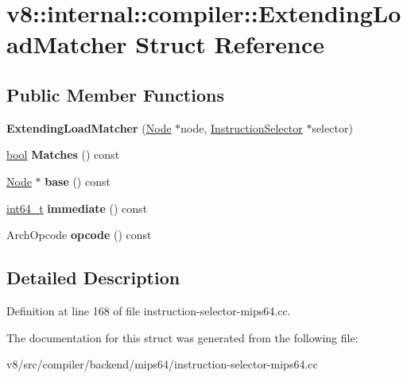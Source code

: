 \hypertarget{structv8_1_1internal_1_1compiler_1_1ExtendingLoadMatcher}{}\section{v8\+:\+:internal\+:\+:compiler\+:\+:Extending\+Load\+Matcher Struct Reference}
\label{structv8_1_1internal_1_1compiler_1_1ExtendingLoadMatcher}
\subsection*{Public Member Functions}
\begin{DoxyCompactItemize}
\item 
\mbox{\label{structv8_1_1internal_1_1compiler_1_1ExtendingLoadMatcher_affb8417c4787548f161146e1b511cd37}} 
{\bfseries Extending\+Load\+Matcher} (\mbox{\hyperlink{classv8_1_1internal_1_1compiler_1_1Node}{Node}} $\ast$node, \mbox{\hyperlink{classv8_1_1internal_1_1compiler_1_1InstructionSelector}{Instruction\+Selector}} $\ast$selector)
\item 
\mbox{\label{structv8_1_1internal_1_1compiler_1_1ExtendingLoadMatcher_a7760a9b638828a662d68f656731f70d3}} 
\mbox{\hyperlink{classbool}{bool}} {\bfseries Matches} () const
\item 
\mbox{\label{structv8_1_1internal_1_1compiler_1_1ExtendingLoadMatcher_a5c77b9446d15b0394c0a931ed8d72e49}} 
\mbox{\hyperlink{classv8_1_1internal_1_1compiler_1_1Node}{Node}} $\ast$ {\bfseries base} () const
\item 
\mbox{\label{structv8_1_1internal_1_1compiler_1_1ExtendingLoadMatcher_afbda82fef4903ca70be1fff880db2200}} 
\mbox{\hyperlink{classint64__t}{int64\+\_\+t}} {\bfseries immediate} () const
\item 
\mbox{\label{structv8_1_1internal_1_1compiler_1_1ExtendingLoadMatcher_ab4724f90ed18c36447080e4e76820890}} 
Arch\+Opcode {\bfseries opcode} () const
\end{DoxyCompactItemize}


\subsection{Detailed Description}


Definition at line 168 of file instruction-\/selector-\/mips64.\+cc.



The documentation for this struct was generated from the following file\+:\begin{DoxyCompactItemize}
\item 
v8/src/compiler/backend/mips64/instruction-\/selector-\/mips64.\+cc\end{DoxyCompactItemize}
